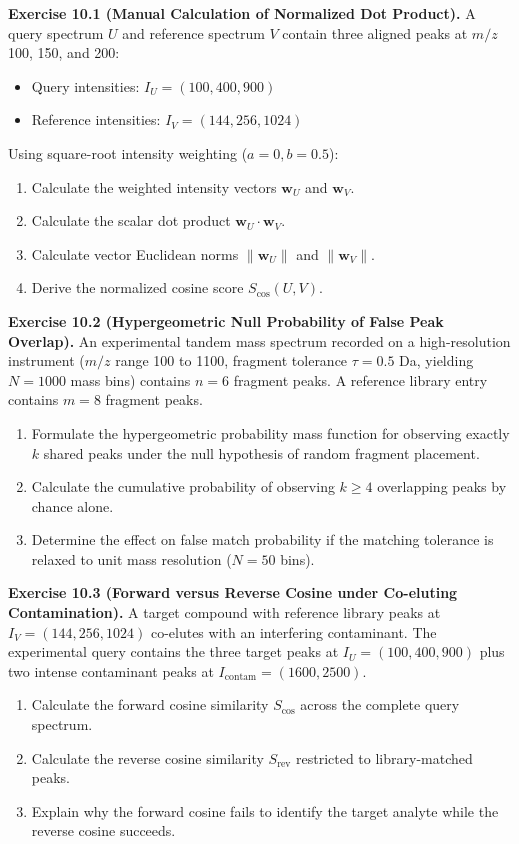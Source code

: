 \documentclass[11pt,twoside,openright]{book}
\begin{document}
\noindent\textbf{Exercise 10.1 (Manual Calculation of Normalized Dot Product).}\enspace
\label{ex:manual_cosine}
A query spectrum $U$ and reference spectrum $V$ contain three aligned peaks at $m/z$ 100, 150, and 200:
\begin{itemize}
    \item Query intensities: $I_U = (100, 400, 900)$
    \item Reference intensities: $I_V = (144, 256, 1024)$
\end{itemize}
Using square-root intensity weighting ($a = 0, b = 0.5$):
\begin{enumerate}
    \item Calculate the weighted intensity vectors $\mathbf{w}_U$ and $\mathbf{w}_V$.
    \item Calculate the scalar dot product $\mathbf{w}_U \cdot \mathbf{w}_V$.
    \item Calculate vector Euclidean norms $\|\mathbf{w}_U\|$ and $\|\mathbf{w}_V\|$.
    \item Derive the normalized cosine score $S_{\cos}(U, V)$.
\end{enumerate}

\vspace{0.8em}
\noindent\textbf{Exercise 10.2 (Hypergeometric Null Probability of False Peak Overlap).}\enspace
\label{ex:hypergeometric_pvalue}
An experimental tandem mass spectrum recorded on a high-resolution instrument ($m/z$ range 100 to 1100, fragment tolerance $\tau = 0.5$ Da, yielding $N = 1000$ mass bins) contains $n = 6$ fragment peaks. A reference library entry contains $m = 8$ fragment peaks.
\begin{enumerate}
    \item Formulate the hypergeometric probability mass function for observing exactly $k$ shared peaks under the null hypothesis of random fragment placement.
    \item Calculate the cumulative probability of observing $k \ge 4$ overlapping peaks by chance alone.
    \item Determine the effect on false match probability if the matching tolerance is relaxed to unit mass resolution ($N = 50$ bins).
\end{enumerate}

\vspace{0.8em}
\noindent\textbf{Exercise 10.3 (Forward versus Reverse Cosine under Co-eluting Contamination).}\enspace
\label{ex:reverse_cosine_chimeric}
A target compound with reference library peaks at $I_V = (144, 256, 1024)$ co-elutes with an interfering contaminant. The experimental query contains the three target peaks at $I_U = (100, 400, 900)$ plus two intense contaminant peaks at $I_{\text{contam}} = (1600, 2500)$.
\begin{enumerate}
    \item Calculate the forward cosine similarity $S_{\cos}$ across the complete query spectrum.
    \item Calculate the reverse cosine similarity $S_{\text{rev}}$ restricted to library-matched peaks.
    \item Explain why the forward cosine fails to identify the target analyte while the reverse cosine succeeds.
\end{enumerate}
\end{document}
